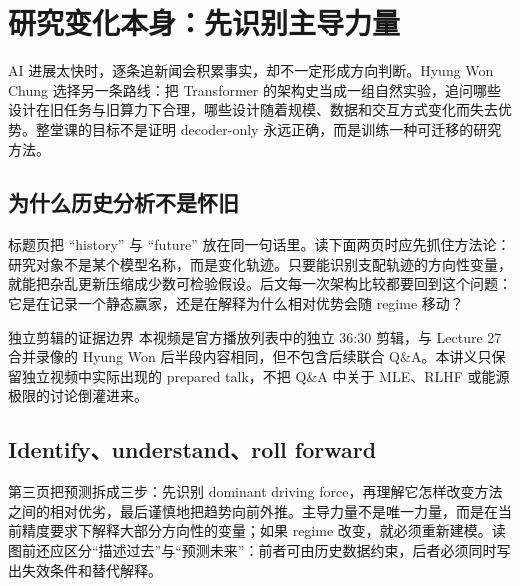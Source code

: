 \section{研究变化本身：先识别主导力量}

AI 进展太快时，逐条追新闻会积累事实，却不一定形成方向判断。Hyung Won Chung 选择另一条路线：把 Transformer 的架构史当成一组自然实验，追问哪些设计在旧任务与旧算力下合理，哪些设计随着规模、数据和交互方式变化而失去优势。整堂课的目标不是证明 decoder-only 永远正确，而是训练一种可迁移的研究方法。

\subsection{为什么历史分析不是怀旧}

标题页把 ``history'' 与 ``future'' 放在同一句话里。读下面两页时应先抓住方法论：研究对象不是某个模型名称，而是变化轨迹。只要能识别支配轨迹的方向性变量，就能把杂乱更新压缩成少数可检验假设。后文每一次架构比较都要回到这个问题：它是在记录一个静态赢家，还是在解释为什么相对优势会随 regime 移动？




\begin{warningbox}{独立剪辑的证据边界}
本视频是官方播放列表中的独立 36:30 剪辑，与 Lecture 27 合并录像的 Hyung Won 后半段内容相同，但不包含后续联合 Q\&A。本讲义只保留独立视频中实际出现的 prepared talk，不把 Q\&A 中关于 MLE、RLHF 或能源极限的讨论倒灌进来。
\end{warningbox}

\subsection{Identify、understand、roll forward}

第三页把预测拆成三步：先识别 dominant driving force，再理解它怎样改变方法之间的相对优劣，最后谨慎地把趋势向前外推。主导力量不是唯一力量，而是在当前精度要求下解释大部分方向性的变量；如果 regime 改变，就必须重新建模。读图前还应区分“描述过去”与“预测未来”：前者可由历史数据约束，后者必须同时写出失效条件和替代解释。

